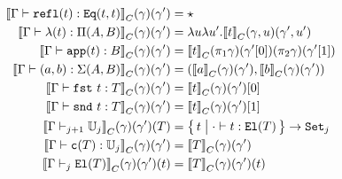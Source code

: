 \begin{align*}
  \denotesC{\goodTerm{\Gm}{\eqrefl{t}}{\TyId{t}{t}}}(\gm)(\gm') &= \star\\
  \denotesC{\goodTerm{\Gm}{\lam{t}}{\TyPi{A}{B}}}(\gm)(\gm') &= \lambda u \lambda u' . \denotesC{t}(\SubstExt{\gm}{u}) (\gm' , u') \\
  \denotesC{\goodTerm{\Gm}{\app{t}}{B}}(\gm)(\gm') &= \denotesC{t}(\pi_1 \gm)(\gm'[0])(\pi_2 \gm)(\gm'[1]) \\
  \denotesC{\goodTerm{\Gm}{\pair{a}{b}}{\TySigma{A}{B}}}(\gm)(\gm') &= (\denotesC{a}(\gm)(\gm') , \denotesC{b}(\gm)(\gm') )\\
  \denotesC{\goodTerm{\Gm}{\fst{t}}{T}}(\gm)(\gm') &= \denotesC{t}(\gm)(\gm')[0] \\
  \denotesC{\goodTerm{\Gm}{\snd{t}}{T}}(\gm)(\gm') &= \denotesC{t}(\gm)(\gm')[1]\\
  \denotesC{\goodType{\Gm}{\cU_j}{j+1}}(\gm)(\gm')(T) &= \setc{t} { \goodTerm{\cdot}{t}{\El{T}} }  \to \Set{j} \\
  \denotesC{\goodTerm{\Gm}{\codety{T}}{\cU_j}}(\gm)(\gm') &= \denotesC{T}(\gm)(\gm') \\ 
  \denotesC{\goodType{\Gm}{\El{T}}{j}}(\gm)(\gm')(t) &= \denotesC{T}(\gm)(\gm')(t) \\
\end{align*}

\newcommand{\Glued}[1]{\ensuremath{{#1}^\bullet}}
\newcommand{\GluedPi}[2]{\ensuremath{\Pi^\bullet({#1},{#2})}}
\newcommand{\GSubstExt}[2]{\ensuremath{{#1},^\bullet{#2}}}
\newcommand{\Gpair}[2]{\ensuremath{({#1},^\bullet{#2})}}
\newcommand{\Gfst}[1]{\ensuremath{\texttt{fst}^\bullet~{#1}}}
\newcommand{\Gsnd}[1]{\ensuremath{\texttt{snd}^\bullet~{#1}}}
\newcommand{\Gsub}[2]{\ensuremath{{#1}\!\left[{#2}\right]^\bullet}}
\newcommand{\Glam}[1]{\ensuremath{\lambda^\bullet({#1})}}
\newcommand{\Gapp}[1]{\ensuremath{\texttt{app}^\bullet({#1})}}
\newcommand{\GSubstWeak}[1]{\ensuremath{(\texttt{p}^\bullet)^{#1}}}
\newcommand{\GLSigAdd}[3]{\ensuremath{\nu^{+\bullet}({#1},{#2},{#3})}}
\newcommand{\GCaseSig}[3]{\ensuremath{\texttt{CaseTy}^\bullet({#1},{#2},{#3})}}
\newcommand{\Gmodel}[1]{\ensuremath{{({#1})}^c}}
\newcommand{\GEl}[1]{\ensuremath{\Glued{\texttt{El}}({#1})}}
\newcommand{\Gwcode}[1]{\ensuremath{\Glued{\texttt{W}}({#1})}}
\newcommand{\GSubstId}{\ensuremath{\GSubstWeak{0}}}
\newcommand{\Gwsigproj}[3]{\ensuremath{\Glued{{\texttt{w}\pi^{#1}_{\texttt{#2}}}}({#3})}}
\newcommand{\GRecproj}[2]{\ensuremath{\Glued{{\texttt{R}\pi^{#1}}}({#2})}}



